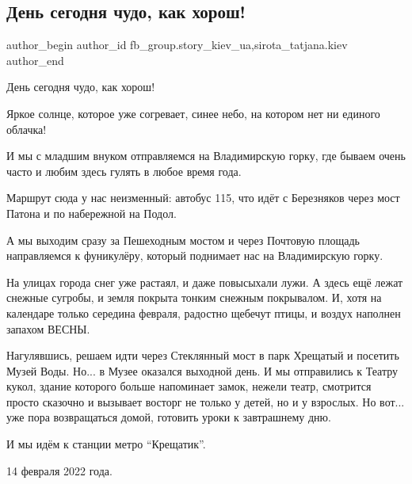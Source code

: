  
 
 
 
 
 
\subsection{День сегодня чудо, как хорош!}
\label{sec:15_02_2022.fb.fb_group.story_kiev_ua.1.den_segodnja_chudo}
 
\ifcmt
 author_begin
   author_id fb_group.story_kiev_ua,sirota_tatjana.kiev
 author_end
\fi

День сегодня чудо, как хорош!

Яркое солнце, которое уже согревает, синее небо, на котором нет ни единого
облачка!

И мы с младшим внуком отправляемся на Владимирскую горку, где бываем очень часто
и любим здесь гулять в любое время года.

Маршрут сюда у нас неизменный: автобус 115, что идёт с Березняков через мост
Патона и по набережной на Подол.

\raggedcolumns
\begin{multicols}{3} %
\setlength{\parindent}{0pt}



\end{multicols} %

А мы выходим сразу за Пешеходным мостом и через Почтовую площадь направляемся к
фуникулёру, который поднимает нас на Владимирскую горку.

На улицах города снег уже растаял, и даже повысыхали лужи. А здесь ещё лежат
снежные сугробы, и земля покрыта тонким снежным покрывалом. И, хотя на календаре
только середина февраля, радостно щебечут птицы, и воздух наполнен  запахом
ВЕСНЫ.

Нагулявшись, решаем идти через Стеклянный мост в парк Хрещатый и посетить Музей
Воды. Но... в Музее оказался выходной день. И мы отправились к Театру
кукол, здание которого больше напоминает замок, нежели театр, смотрится просто
сказочно и вызывает восторг не только у детей, но и у взрослых. Но вот... уже
пора возвращаться домой, готовить уроки к завтрашнему дню.

И мы идём к станции метро \enquote{Крещатик}.

14 февраля 2022 года.
